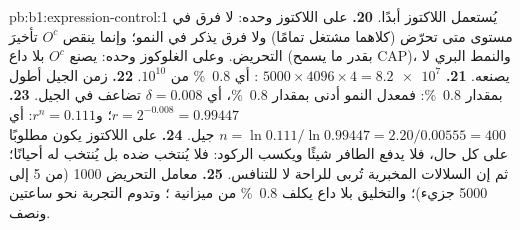 \begin{solution}{pb:b1:expression-control:1}
يُستعمل اللاكتوز أبدًا.
\textbf{20.} على اللاكتوز وحده: لا فرق في مستوى  متى تحرّض
(كلاهما مشتغل تمامًا) ولا فرق يذكر في النمو؛ وإنما ينقص $O^c$ تأخيرَ
التحريض. وعلى الغلوكوز وحده: يصنع $O^c$  بلا داع (بقدر ما
يسمح CAP)، والنمط البري لا يصنعه.
\textbf{21.} $5000\times 4096\times 4 = \num{8.2e7}$ : أي \qty{0.8}{\%}
من $10^{10}$.
\textbf{22.} زمن الجيل أطول بمقدار \qty{0.8}{\%}: فمعدل النمو أدنى
بمقدار \qty{0.8}{\%}، أي $\delta = 0.008$ تضاعف في الجيل.
\textbf{23.} $r = 2^{-0.008} = 0.99447$؛ و$r^n = 0.111$: أي $n =
\ln 0.111/\ln 0.99447 = 2.20/0.00555 = 400$ جيل.
\textbf{24.} على اللاكتوز يكون  مطلوبًا على كل حال، فلا يدفع
الطافر شيئًا ويكسب الركود: فلا يُنتخب ضده بل يُنتخب له أحيانًا؛ ثم
إن السلالات المخبرية تُربى للراحة لا للتنافس.
\textbf{25.} معامل التحريض 1000 (من 5 إلى \num{5000} جزيء)؛ والتخليق
بلا داع يكلف \qty{0.8}{\%} من ميزانية ؛ وتدوم التجربة نحو ساعتين
ونصف.
\end{solution}
